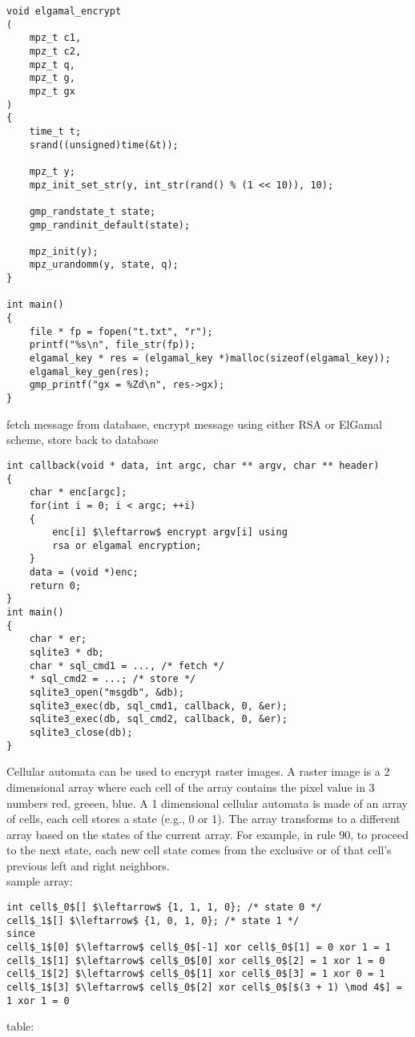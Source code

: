 \documentclass[12pt, border = 4pt, multi]{article} %
\begin{document}
\begin{multicols}{2}
\begin{lstlisting}[morekeywords = {mpz_t, time_t, define, undef}]
void elgamal_encrypt
(
	mpz_t c1,
	mpz_t c2,
	mpz_t q,
	mpz_t g,
	mpz_t gx
)
{
	time_t t;
	srand((unsigned)time(&t)); 
	
	mpz_t y;
	mpz_init_set_str(y, int_str(rand() % (1 << 10)), 10);

	gmp_randstate_t state;
	gmp_randinit_default(state);

	mpz_init(y);
	mpz_urandomm(y, state, q);
}

int main()
{
	file * fp = fopen("t.txt", "r");
	printf("%s\n", file_str(fp));
	elgamal_key * res = (elgamal_key *)malloc(sizeof(elgamal_key));
	elgamal_key_gen(res);
	gmp_printf("gx = %Zd\n", res->gx);
}
\end{lstlisting}
fetch message from database, encrypt message using either RSA or ElGamal scheme, store back to database
\begin{lstlisting}[mathescape = true]
int callback(void * data, int argc, char ** argv, char ** header)
{
    char * enc[argc];
    for(int i = 0; i < argc; ++i)
    {
    	enc[i] $\leftarrow$ encrypt argv[i] using
    	rsa or elgamal encryption;
    }
    data = (void *)enc;
    return 0;
}
int main()
{
    char * er;
    sqlite3 * db;
    char * sql_cmd1 = ..., /* fetch */
    * sql_cmd2 = ...; /* store */
    sqlite3_open("msgdb", &db);
    sqlite3_exec(db, sql_cmd1, callback, 0, &er);
    sqlite3_exec(db, sql_cmd2, callback, 0, &er);
    sqlite3_close(db);
}
\end{lstlisting}
Cellular automata can be used to encrypt raster images. A raster image is a 2 dimensional array where each cell of the array contains the pixel value in 3 numbers red, greeen, blue. A 1 dimensional cellular automata is made of an array of cells, each cell stores a state (e.g., 0 or 1). The array transforms to a different array based on the states of the current array. For example, in rule 90, to proceed to the next state, each new cell state comes from the exclusive or of that cell's previous left and right neighbors.\\
sample array:
\begin{lstlisting}[mathescape = true]
int cell$_0$[] $\leftarrow$ {1, 1, 1, 0}; /* state 0 */
cell$_1$[] $\leftarrow$ {1, 0, 1, 0}; /* state 1 */
since
cell$_1$[0] $\leftarrow$ cell$_0$[-1] xor cell$_0$[1] = 0 xor 1 = 1
cell$_1$[1] $\leftarrow$ cell$_0$[0] xor cell$_0$[2] = 1 xor 1 = 0
cell$_1$[2] $\leftarrow$ cell$_0$[1] xor cell$_0$[3] = 1 xor 0 = 1
cell$_1$[3] $\leftarrow$ cell$_0$[2] xor cell$_0$[$(3 + 1) \mod 4$] = 1 xor 1 = 0
\end{lstlisting}
table:\\

\end{multicols}
\end{document}
